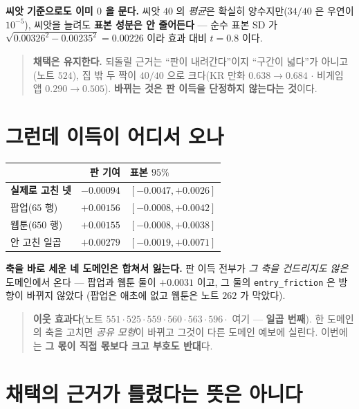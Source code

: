 \documentclass[11pt]{article}
\begin{document}
\textbf{씨앗 기준으로도 이미 $0$ 을 문다.} 씨앗 $40$ 의 \emph{평균}은 확실히
양수지만($34/40$ 은 우연이 $10^{-5}$), 씨앗을 늘려도 \textbf{표본 성분은
안 줄어든다} --- 순수 표본 SD 가
$\sqrt{0.00326^2-0.00235^2}=\mathbf{0.00226}$ 이라 효과 대비 $t{=}0.8$ 이다.

\begin{quote}
\textbf{채택은 유지한다.} 되돌릴 근거는 ``판이 내려간다''이지 ``구간이
넓다''가 아니고(노트 $524$), 집 밖 두 짝이 $40/40$ 으로 크다(KR 만화
$0.638\!\to\!0.684$ $\cdot$ 비게임 앱 $0.290\!\to\!0.505$). \textbf{바뀌는
것은 판 이득을 단정하지 않는다는 것}이다.
\end{quote}

\section{그런데 이득이 어디서 오나}

\begin{center}
\begin{tabular}{lrl}
\hline
 & 판 기여 & 표본 $95\%$ \\
\hline
\textbf{실제로 고친 넷} & $\mathbf{-0.00094}$ & $[-0.0047, +0.0026]$ \\
팝업($65$ 행) & $+0.00156$ & $[-0.0008, +0.0042]$ \\
웹툰($650$ 행) & $+0.00155$ & $[-0.0008, +0.0038]$ \\
안 고친 일곱 & $+0.00279$ & $[-0.0019, +0.0071]$ \\
\hline
\end{tabular}
\end{center}

\textbf{축을 바로 세운 네 도메인은 합쳐서 잃는다.} 판 이득 전부가
\emph{그 축을 건드리지도 않은} 도메인에서 온다 --- 팝업과 웹툰 둘이
$+0.0031$ 이고, 그 둘의 \texttt{entry\_friction} 은 방향이 바뀌지 않았다
(팝업은 애초에 없고 웹툰은 노트 $262$ 가 막았다).

\begin{quote}
\textbf{이웃 효과다}(노트 $551 \cdot 525 \cdot 559 \cdot 560 \cdot 563
\cdot 596 \cdot$ 여기 --- \textbf{일곱 번째}). 한 도메인의 축을 고치면
\emph{공유 모형}이 바뀌고 그것이 다른 도메인 예보에 실린다. 이번에는
\textbf{그 몫이 직접 몫보다 크고 부호도 반대}다.
\end{quote}

\section{채택의 근거가 틀렸다는 뜻은 아니다}
\end{document}
